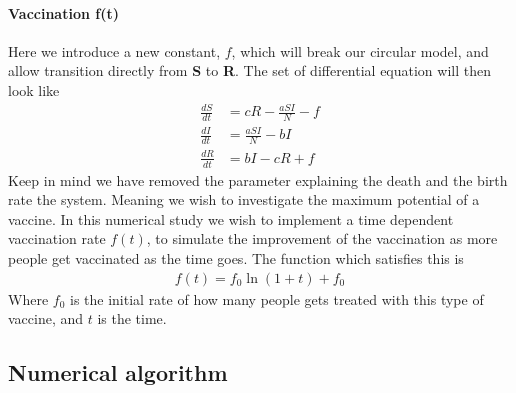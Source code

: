 \documentclass[a4paper, 10pt]{article}
\begin{document}
\paragraph{Vaccination f(t)}\label{vaccination f(t)}  Here we introduce a new constant, $f$,
which will break our circular model, and allow transition directly from \textbf{S} to
\textbf{R}. The set of differential equation will then look like
\begin{align*}
  \frac{dS}{dt} &= cR - \frac{aSI}{N} - f\\
  \frac{dI}{dt} &= \frac{aSI}{N} - bI \\
  \frac{dR}{dt} &= bI - cR + f
\end{align*}
Keep in mind we have removed the parameter explaining the death and the birth rate the system.
Meaning we wish to investigate the maximum potential of a vaccine.
In this numerical study we wish to implement a time dependent vaccination rate $f(t)$,
to simulate the improvement of the vaccination as more people get vaccinated as the time goes.
The function which satisfies this is
\begin{align}
  f(t) = f_{0}\ln{(1+t)} + f_{0}
\end{align}
Where $f_{0}$ is the initial rate of how many people gets treated with this type of vaccine, and
$t$ is the time.

\subsection{Numerical algorithm}
\end{document}
